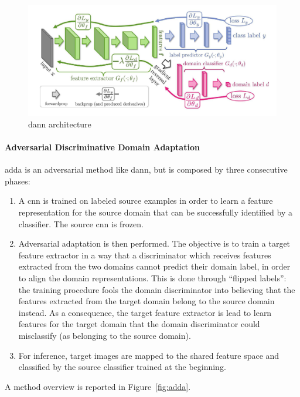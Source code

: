 \documentclass[%
    corpo=12pt,
    twoside,
    stile=classica,   
    tipotesi=magistrale,
    evenboxes,
    english,
	numerazioneromana,
]{toptesi}
\begin{document}
\begin{figure}[ht!]
	\centering
	\includegraphics[width=0.8\linewidth]{imgs/dann.png}
	\caption{\gls{dann} architecture\cite{ganin2015unsupervised}}
	\label{fig:dann}
\end{figure}


\paragraph{Adversarial Discriminative Domain Adaptation}\label{sec:adda}
\gls{adda}\cite{tzeng2017adversarial} is an adversarial method like \gls{dann}, but is composed by three consecutive phases:
\begin{enumerate}
	\item A \gls{cnn} is trained on labeled source examples in order to learn a feature representation for the source domain that can be successfully identified by a classifier. The source \gls{cnn} is frozen.
	\item Adversarial adaptation is then performed. The objective is to train a target feature extractor in a way that a discriminator which receives features extracted from the two domains cannot predict their domain label, in order to align the domain representations. This is done through \textquotedblleft flipped labels\textquotedblright : the training procedure fools the domain discriminator into believing that the features ex\-trac\-ted from the target domain belong to the source domain instead. As a consequence, the target feature extractor is lead to learn features for the target domain that the domain discriminator could misclassify (as belonging to the source domain).
	\item For inference, target images are mapped to the shared feature space and classified by the source classifier trained at the beginning.
\end{enumerate}
A method overview is reported in Figure~\ref{fig:adda}.
\end{document}
